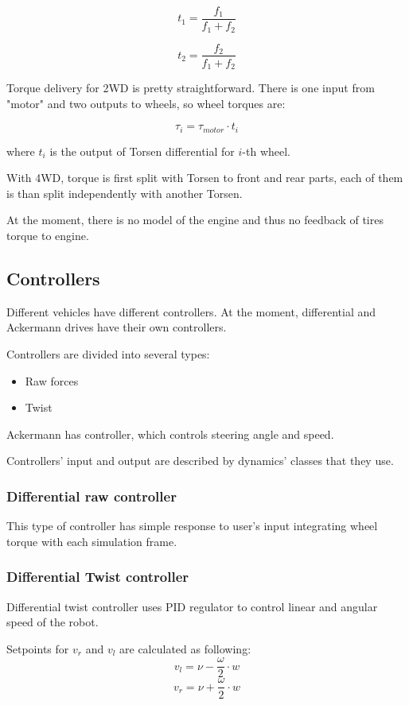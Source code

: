 \documentclass[a4paper,11pt]{article}
\begin{document}
$$
t_1 = \frac{f_1}{f_1 + f_2}
$$

$$
t_2 = \frac{f_2}{f_1 + f_2}
$$

Torque delivery for 2WD is pretty straightforward. There is one input from "motor" and two outputs to wheels, so wheel torques are:

$$
\tau_i = \tau_{motor} \cdot t_i
$$

where $t_i$ is the output of Torsen differential for $i$-th wheel.

With 4WD, torque is first split with Torsen to front and rear parts, each of them is than split independently with another Torsen.

At the moment, there is no model of the engine and thus no feedback of tires torque to engine. 


\subsection{Controllers}

Different vehicles have different controllers. 
At the moment, differential and Ackermann drives have their own controllers. 

Controllers are divided into several types: 
\begin{itemize}
\item Raw forces
\item Twist
\end{itemize}

Ackermann has controller, which controls steering angle and speed. 

Controllers' input and output are described by dynamics' classes that they use. 

\subsubsection{Differential raw controller}

This type of controller has simple response to user's input integrating wheel torque with each simulation frame.

\subsubsection{Differential Twist controller}

Differential twist controller uses PID regulator to control linear and angular speed of the robot. 

Setpoints for $v_r$ and $v_l$ are calculated as following:
$$
v_l = \nu - \frac{\omega}{2} \cdot w
$$
$$
v_r = \nu + \frac{\omega}{2} \cdot w
$$
\end{document}
